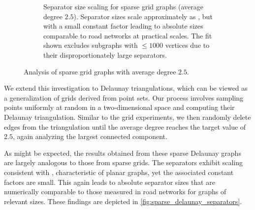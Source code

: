 \begin{figure}[tbhp]
\begin{subfigure}{0.55\linewidth}
        \caption{Separator size scaling for sparse grid graphs (average degree \(2.5\)). Separator sizes scale approximately as , but with a small constant factor leading to absolute sizes comparable to road networks at practical scales. The fit shown excludes subgraphs with \( \le 1000 \) vertices due to their disproportionately large separators.}
        \label{fig:sparse_grid_sep_plot}
    \end{subfigure}
    \caption{Analysis of sparse grid graphs with average degree \(2.5\).}
    \label{fig:sparse_grid_separators}
\end{figure}

We extend this investigation to Delaunay triangulations, which can be viewed as a generalization of grids derived from point sets.
Our process involves sampling points uniformly at random in a two-dimensional space and computing their Delaunay triangulation.
Similar to the grid experiments, we then randomly delete edges from the triangulation until the average degree reaches the target value of \(2.5\), again analyzing the largest connected component.

As might be expected, the results obtained from these sparse Delaunay graphs are largely analogous to those from sparse grids.
The separators exhibit scaling consistent with , characteristic of planar graphs, yet the associated constant factors are small.
This again leads to absolute separator sizes that are numerically comparable to those measured in road networks for graphs of relevant sizes.
These findings are depicted in \cref{fig:sparse_delaunay_separators}.

